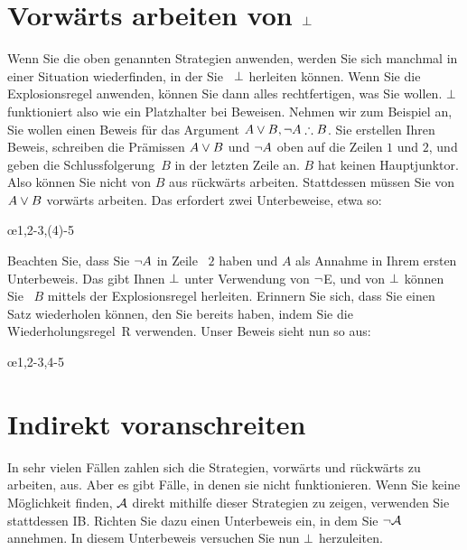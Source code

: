 \section{Vorwärts arbeiten von $\bot$}\label{sec:backred}

Wenn Sie die oben genannten Strategien anwenden, werden Sie sich manchmal in einer Situation wiederfinden, in der Sie ~$\bot$ herleiten können. Wenn Sie die Explosionsregel anwenden, können Sie dann alles rechtfertigen, was Sie wollen. $\bot$ funktioniert also wie ein Platzhalter bei Beweisen. Nehmen wir zum Beispiel an, Sie wollen einen Beweis für das Argument $A \eor B, \enot A \therefore B$. Sie erstellen Ihren Beweis, schreiben die Prämissen $A \vee B$ und $\neg A$ oben auf die Zeilen $1$ und $2$, und geben die Schlussfolgerung~$B$ in der letzten Zeile an. $B$ hat keinen Hauptjunktor. Also können Sie nicht von $B$ aus rückwärts arbeiten. Stattdessen müssen Sie von $A \vee B$ vorwärts arbeiten. Das erfordert zwei Unterbeweise, etwa so:
\begin{fitchproof}
	\open
	\ellipsesline 
	\close 
	\open
	\ellipsesline
	\close
	\oe{1,2-3,(4)-5} 
\end{fitchproof} 
Beachten Sie, dass Sie $\neg A$ in Zeile ~$2$ haben und $A$ als Annahme in Ihrem ersten Unterbeweis. Das gibt Ihnen $\bot$ unter Verwendung von $\neg$E, und von $\bot$ können Sie ~$B$ mittels der Explosionsregel herleiten. Erinnern Sie sich, dass Sie einen Satz wiederholen können, den Sie bereits haben, indem Sie die Wiederholungsregel~R verwenden. Unser Beweis sieht nun so aus:
\begin{fitchproof}
	\open
	\close 
	\open
	\close
	\oe{1,2-3,4-5} 
\end{fitchproof} 

\section{Indirekt voranschreiten}

In sehr vielen Fällen zahlen sich die Strategien, vorwärts und rückwärts zu arbeiten, aus. Aber es gibt Fälle, in denen sie nicht funktionieren. Wenn Sie keine Möglichkeit finden, $\mathcal{A}$ direkt mithilfe dieser Strategien zu zeigen, verwenden Sie stattdessen IB. Richten Sie dazu einen Unterbeweis ein, in dem Sie $\neg\mathcal{A}$ annehmen. In diesem Unterbeweis versuchen Sie nun $\bot$ herzuleiten.

